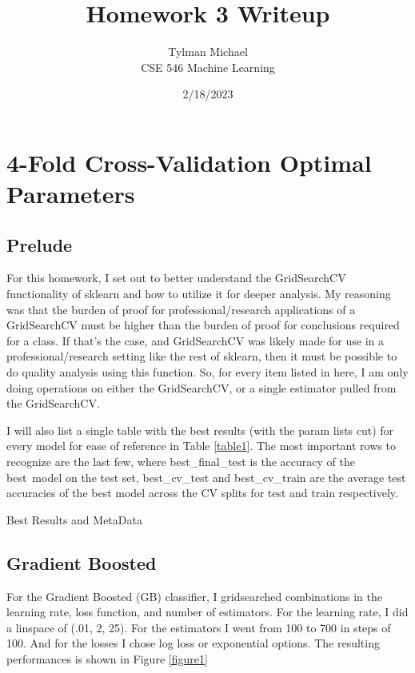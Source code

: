 \documentclass[12pt]{article}
\title{Homework 3 Writeup}
\author{Tylman Michael\\CSE 546 Machine Learning}
\date{2/18/2023}
\begin{document}
\maketitle{}
\section{4-Fold Cross-Validation Optimal Parameters}
\subsection{Prelude}
For this homework, I set out to better understand the GridSearchCV functionality of sklearn and how to utilize it for 
deeper analysis. My reasoning was that the burden of proof for professional/research applications of a GridSearchCV must be higher
than the burden of proof for conclusions required for a class. If that's the case, and GridSearchCV was likely made for 
use in a professional/research setting like the rest of sklearn, then it must be possible to do quality analysis using 
this function. So, for every item listed in here, I am only doing operations on either the GridSearchCV, or a single estimator pulled
from the GridSearchCV.

I will also list a single table with the best results (with the param lists cut) for every model for ease of reference 
in Table \ref{table1}. The most important rows to recognize are the last few, where best\_final\_test is the accuracy 
of the best\ model on the test set, best\_cv\_test and best\_cv\_train are the average test accuracies of the best model
 across the CV splits for test and train respectively.  
\begin{table}
  \resizebox*{.95\textwidth}{!}{}
  \caption{Best Results and MetaData}
  \label{table1}
\end{table}

\subsection{Gradient Boosted}
For the Gradient Boosted (GB) classifier, I gridsearched combinations in the learning rate, loss function, and number of estimators.
For the learning rate, I did a linspace of (.01, 2, 25). For the estimators I went from 100 to 700 in steps of 100. And 
for the losses I chose log loss or exponential options. The resulting performances is shown in Figure \ref{figure1}
\end{document}
